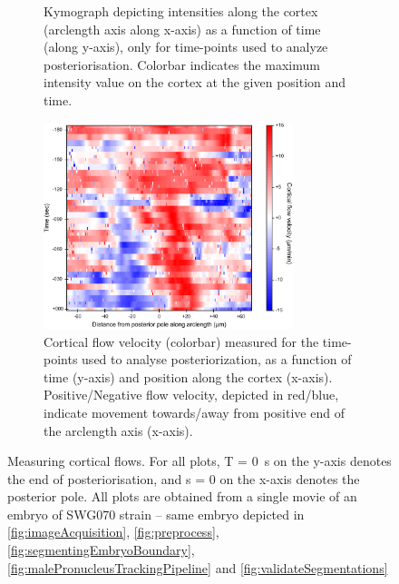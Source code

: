 \begin{figure}[p]
\begin{subfigure}[t]{0.45\textwidth}
    \caption{Kymograph depicting intensities along the cortex (arclength axis along x-axis) as a function of time (along y-axis), only for time-points used to analyze posteriorisation. Colorbar indicates the maximum intensity value on the cortex at the given position and time.} 
    \label{subfig:crtxFlowMeasurement-kymographPosteriorization}
\end{subfigure}

\begin{subfigure}{\textwidth}
    \centering
    \includegraphics[width=0.8\textwidth]{ExpMethods/FigCrtxFlows/crtxFlows.pdf}
    \caption{Cortical flow velocity (colorbar) measured for the time-points used to analyse posteriorization, as a function of time (y-axis) and position along the cortex (x-axis). Positive/Negative flow velocity, depicted in red/blue, indicate movement towards/away from positive end of the arclength axis (x-axis).} 
    \label{subfig:crtxFlowMeasurement-crtxFlows}
\end{subfigure}

\caption[Image analysis: Measuring cortical flows]{Measuring cortical flows. For all plots, T = \SI{0}{\second} on the y-axis denotes the end of posteriorisation, and s = \SI{0}{\unitLength} on the x-axis denotes the posterior pole. All plots are obtained from a single movie of an embryo of SWG070 strain -- same embryo depicted in \autoref{fig:imageAcquisition}, \autoref{fig:preprocess}, \autoref{fig:segmentingEmbryoBoundary}, \autoref{fig:malePronucleusTrackingPipeline} and \autoref{fig:validateSegmentations}}
\label{fig:crtxFlowMeasurement}
\end{figure}


